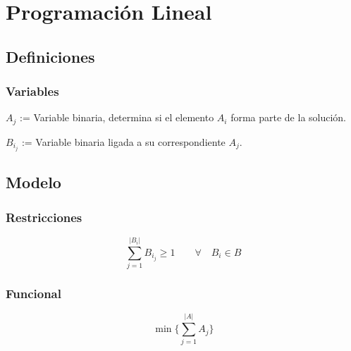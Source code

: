 \section{Programaci\'on Lineal}

\subsection{Definiciones}

\subsubsection{Variables}

\begin{center}
    $A_j$ := Variable binaria, determina si el elemento $A_i$ forma parte de la
    soluci\'on.

    $B_{i_j}$ := Variable binaria ligada a su correspondiente $A_j$.
\end{center}

\subsection{Modelo}

\subsubsection{Restricciones}

\begin{equation}
    \sum_{j=1}^{|B_i|} B_{i_j} \ge 1 \qquad \forall \quad B_i \in B
\end{equation}

\subsubsection{Funcional}

\begin{equation}
    \min \{ \sum_{j=1}^{|A|} A_j \}
\end{equation}

